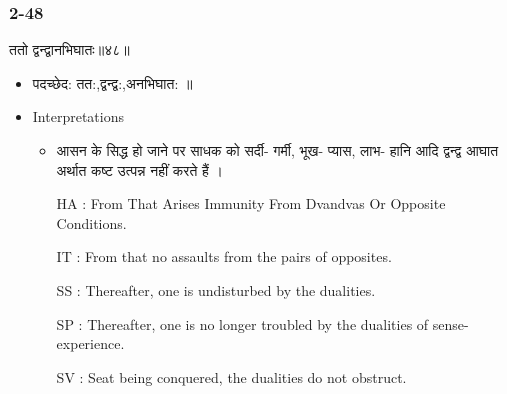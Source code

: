 \begin{frame}[fragile]\frametitle{2-48}
\begin{sanskrit}
ततो द्वन्द्वानभिघातः॥४८॥
\end{sanskrit}

	\begin{itemize}
	\item पदच्छेद: तत:,द्वन्द्व:,अनभिघात: ॥ 
	\item Interpretations
		\begin{itemize}
		\item आसन के सिद्ध हो जाने पर साधक को सर्दी- गर्मी, भूख- प्यास, लाभ- हानि आदि द्वन्द्व आघात अर्थात कष्ट उत्पन्न नहीं करते हैं ।
		\item [HA]: From That Arises Immunity From Dvandvas Or Opposite Conditions.
		\item [IT]: From that no assaults from the pairs of opposites.
		\item [SS]: Thereafter, one is undisturbed by the dualities.
		\item [SP]: Thereafter, one is no longer troubled by the dualities of sense-experience.
		\item [SV]: Seat being conquered, the dualities do not obstruct. 
		\end{itemize}
	\end{itemize}	
\end{frame}

